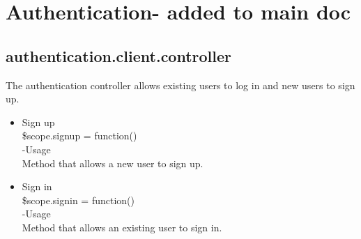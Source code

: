 \documentclass[a4paper,12pt]{article}
\begin{document}
\section{Authentication- added to main doc}
\subsection{authentication.client.controller}
The authentication controller allows existing users to log in and new users to sign up.
 \begin{itemize}
 \item Sign up \\
 \$scope.signup = function()\\
 -Usage\\
 Method that allows a new user to sign up.
 \item Sign in\\
  \$scope.signin = function()\\
 -Usage\\
 Method that allows an existing user to sign in.
 \end{itemize}
\end{document}
